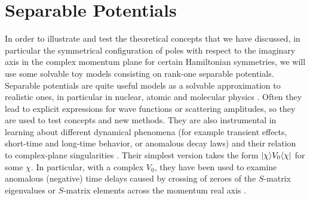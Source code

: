 \section{Separable Potentials}
\label{sep_pot_sec}
%
%
In order to illustrate and test the theoretical concepts that we have discussed, in particular the
symmetrical configuration of poles with respect to the imaginary axis in the complex momentum plane for certain Hamiltonian symmetries, we will use some solvable toy models consisting on rank-one separable potentials.
Separable potentials are quite useful models as a solvable approximation to realistic ones, in particular in nuclear, atomic and molecular physics \cite{Popov2019}.
Often they lead to explicit expressions
for wave functions or scattering amplitudes, so they are used to test concepts and new methods.
They are also instrumental in learning about different dynamical phenomena (for example transient effects, short-time and long-time behavior, or anomalous decay laws)  and their relation to complex-plane singularities
\cite{Muga1990,Muga1996,Muga1996b,Muga1998a}. Their simplest version takes the form
$|\chi\rangle V_0\langle\chi|$ for some  $\chi$.   In particular, with a complex $V_0$,
they have been used to examine anomalous (negative) time delays caused by  crossing of zeroes of the $S$-matrix eigenvalues or $S$-matrix elements across the momentum real axis \cite{Muga1998b}.

